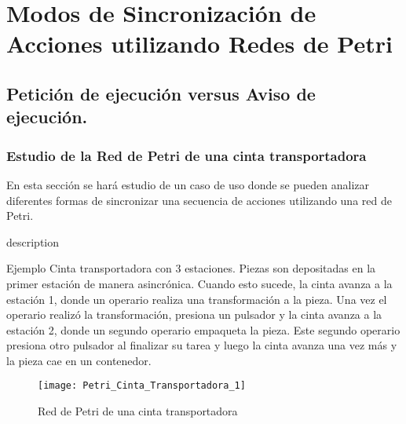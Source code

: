 \section{Modos de Sincronización de Acciones utilizando Redes de Petri}
\label{sec:modos_sincronizacion}
\subsection{Petición de ejecución versus Aviso de ejecución.}
\subsubsection{Estudio de la Red de Petri de una cinta transportadora}
\label{sec:sincronizacion_cinta_transportadora}
En esta sección se hará estudio de un caso de uso donde se pueden analizar
diferentes formas de sincronizar una secuencia de acciones utilizando una red de
Petri.\\

\begin{labeling}{description}
\item [Ejemplo]
Cinta transportadora con 3 estaciones. Piezas son depositadas en la primer
estación  de manera asincrónica. Cuando esto sucede, la cinta avanza a la
estación 1, donde un operario realiza una transformación a la pieza. Una vez el
operario realizó la transformación, presiona un pulsador y la cinta avanza a la
estación 2, donde un segundo operario empaqueta la pieza. Este segundo operario
presiona otro pulsador al finalizar su tarea y luego la cinta avanza una vez
más y la pieza cae en un contenedor.
\end{labeling}

\begin{figure}[H]
    \centering
    \texttt{[image: Petri\_Cinta\_Transportadora\_1]}
    \caption{Red de Petri de una cinta transportadora}
    \label{fig:petri_cinta_transportadora_1}
\end{figure}

